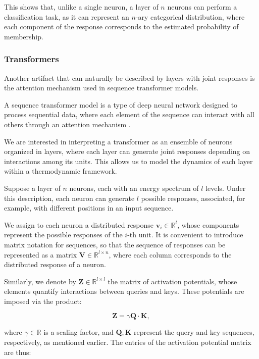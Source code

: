 \documentclass[12pt]{article}
\begin{document}
This shows that, unlike a single neuron, a layer of $n$ neurons can perform a classification task, as it can represent an $n$-ary categorical distribution, where each component of the response corresponds to the estimated probability of membership.
\subsubsection*{Transformers}

Another artifact that can naturally be described by layers with joint responses is the attention mechanism used in sequence transformer models.

A sequence transformer model is a type of deep neural network designed to process sequential data, where each element of the sequence can interact with all others through an attention mechanism \cite{vaswani2017attention}.

We are interested in interpreting a transformer as an ensemble of neurons organized in layers, where each layer can generate joint responses depending on interactions among its units. This allows us to model the dynamics of each layer within a thermodynamic framework.

Suppose a layer of $n$ neurons, each with an energy spectrum of $l$ levels. Under this description, each neuron can generate $l$ possible responses, associated, for example, with different positions in an input sequence.

We assign to each neuron a distributed response $\mathbf{v}_i \in \mathbb{R}^l$, whose components represent the possible responses of the $i$-th unit. It is convenient to introduce matrix notation for sequences, so that the sequence of responses can be represented as a matrix $\mathbf{V} \in \mathbb{R}^{l \times n}$, where each column corresponds to the distributed response of a neuron.

Similarly, we denote by $\mathbf{Z} \in \mathbb{R}^{l \times l}$ the matrix of activation potentials, whose elements quantify interactions between queries and keys. These potentials are imposed via the product:

\begin{equation}
\mathbf{Z} = \gamma \mathbf{Q} \cdot \mathbf{K},
\end{equation}

where $\gamma \in \mathbb{R}$ is a scaling factor, and $\mathbf{Q}, \mathbf{K}$ represent the query and key sequences, respectively, as mentioned earlier. The entries of the activation potential matrix are thus:
\end{document}
